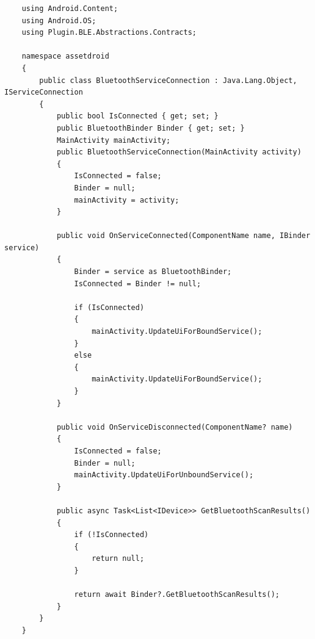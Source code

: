 \begin{lstlisting}
    ﻿using Android.Content;
    using Android.OS;
    using Plugin.BLE.Abstractions.Contracts;
    
    namespace assetdroid
    {
        public class BluetoothServiceConnection : Java.Lang.Object, IServiceConnection
        {
            public bool IsConnected { get; set; }
            public BluetoothBinder Binder { get; set; }
            MainActivity mainActivity;
            public BluetoothServiceConnection(MainActivity activity)
            {
                IsConnected = false;
                Binder = null;
                mainActivity = activity;
            }
            
            public void OnServiceConnected(ComponentName name, IBinder service)
            {
                Binder = service as BluetoothBinder;
                IsConnected = Binder != null;
                
                if (IsConnected)
                {
                    mainActivity.UpdateUiForBoundService();
                }
                else
                {
                    mainActivity.UpdateUiForBoundService();
                }
            }
            
            public void OnServiceDisconnected(ComponentName? name)
            {
                IsConnected = false;
                Binder = null;
                mainActivity.UpdateUiForUnboundService();
            }
            
            public async Task<List<IDevice>> GetBluetoothScanResults()
            {
                if (!IsConnected)
                {
                    return null;
                }
                
                return await Binder?.GetBluetoothScanResults();
            }
        }
    }
\end{lstlisting}
